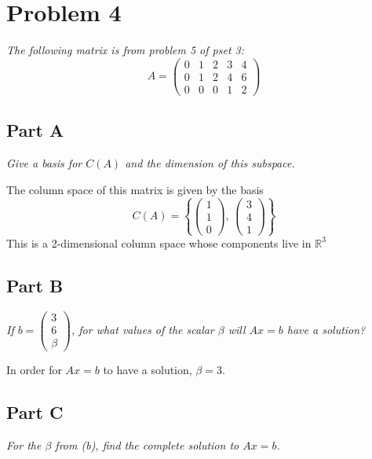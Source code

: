 \documentclass{article}
\begin{document}
\section*{Problem 4}

\textit{The following matrix is from problem 5 of pset 3:}
$$ A = \begin{pmatrix}
    0 & 1 & 2 & 3 & 4 \\
    0 & 1 & 2 & 4 & 6 \\
    0 & 0 & 0 & 1 & 2
\end{pmatrix} $$

\subsection*{Part A}

\textit{Give a basis for $C(A)$ and the dimension of this subspace.}

\bigbreak

The column space of this matrix is given by the basis
$$ C(A) = \left\{ \begin{pmatrix}
    1 \\
    1 \\
    0
\end{pmatrix},\, \begin{pmatrix}
    3 \\
    4 \\
    1
\end{pmatrix} \right\} $$
This is a 2-dimensional column space whose components live in $ \mathbb{R}^3 $

\subsection*{Part B}

\textit{If $b = \begin{pmatrix} 3 \\ 6 \\ \beta \end{pmatrix}$, for what
values of the scalar $\beta$ will $Ax=b$ have a solution?}

\bigbreak

In order for $ Ax = b $ to have a solution, $ \beta = 3 $.

\subsection*{Part C}

\textit{For the $\beta$ from (b), find the complete solution to $Ax=b$.}
\end{document}
